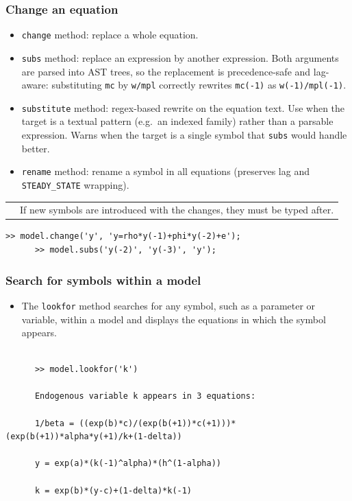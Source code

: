 \documentclass[10pt,slidestop]{beamer}
\makeatletter
\theoremstyle{plain}
\newcommand{\dnote}[1]{%
    \noindent %
    \begin{tabular}{@{}m{0.13\textwidth}@{}m{0.87\textwidth}@{}}%
        \huge\textdbend &#1%
    \end{tabular}%
    \par %
}
\makeatother
\begin{document}
\begin{frame}[c,fragile]
  \frametitle{Change an equation}

  \begin{itemize}
  \item \verb+change+ method: replace a whole equation.
  \item \verb+subs+ method: replace an expression by another expression. Both arguments are parsed into AST trees, so the replacement is precedence-safe and lag-aware: substituting \verb+mc+ by \verb+w/mpl+ correctly rewrites \verb+mc(-1)+ as \verb+w(-1)/mpl(-1)+.
  \item \verb+substitute+ method: regex-based rewrite on the equation text. Use when the target is a textual pattern (e.g.\ an indexed family) rather than a parsable expression. Warns when the target is a single symbol that \verb+subs+ would handle better.
  \item \verb+rename+ method: rename a symbol in all equations (preserves lag and \verb+STEADY_STATE+ wrapping).
  \end{itemize}

    \medskip

    \dnote{If new symbols are introduced with the changes, they must be typed after.}

    \medskip

    \begin{lstlisting}[style=MatlabConsole]
      >> model.change('y', 'y=rho*y(-1)+phi*y(-2)+e');
      >> model.subs('y(-2)', 'y(-3)', 'y');
  \end{lstlisting}

\end{frame}


\begin{frame}[c,fragile]
  \frametitle{Search for symbols within a model}

  \begin{itemize}

  \item The \verb+lookfor+ method searches for any symbol, such as a parameter or variable, within a model and displays the equations in which the symbol appears.\newline

  \end{itemize}

    \medskip

    \begin{lstlisting}[style=MatlabConsole]

      >> model.lookfor('k')

      Endogenous variable k appears in 3 equations:

      1/beta = ((exp(b)*c)/(exp(b(+1))*c(+1)))*(exp(b(+1))*alpha*y(+1)/k+(1-delta))

      y = exp(a)*(k(-1)^alpha)*(h^(1-alpha))

      k = exp(b)*(y-c)+(1-delta)*k(-1)
  \end{lstlisting}

\end{frame}
\end{document}
